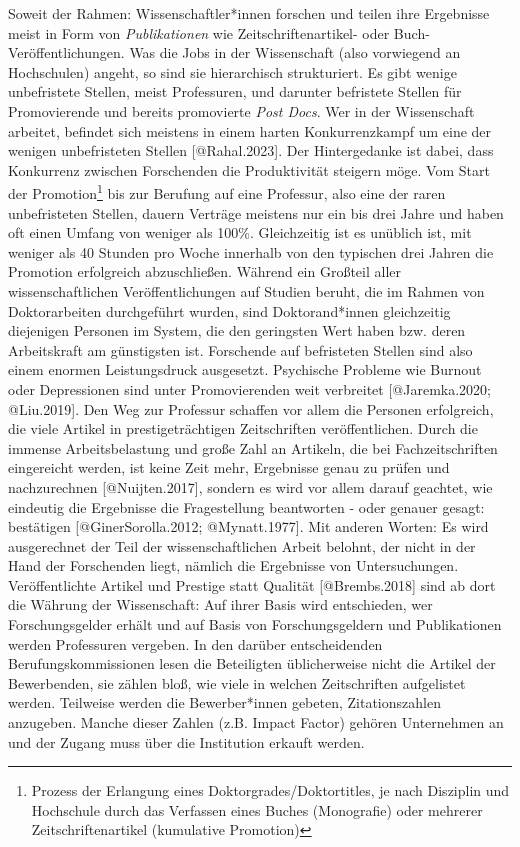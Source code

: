 \documentclass[
  letterpaper,
  DIV=11,
  numbers=noendperiod]{scrreprt}
\begin{document}
Soweit der Rahmen: Wissenschaftler*innen forschen und teilen ihre
Ergebnisse meist in Form von \emph{Publikationen} wie
Zeitschriftenartikel- oder Buch-Veröffentlichungen. Was die Jobs in der
Wissenschaft (also vorwiegend an Hochschulen) angeht, so sind sie
hierarchisch strukturiert. Es gibt wenige unbefristete Stellen, meist
Professuren, und darunter befristete Stellen für Promovierende und
bereits promovierte \emph{Post Docs}. Wer in der Wissenschaft arbeitet,
befindet sich meistens in einem harten Konkurrenzkampf um eine der
wenigen unbefristeten Stellen {[}@Rahal.2023{]}. Der Hintergedanke ist
dabei, dass Konkurrenz zwischen Forschenden die Produktivität steigern
möge. Vom Start der Promotion\footnote{Prozess der Erlangung eines
  Doktorgrades/Doktortitles, je nach Disziplin und Hochschule durch das
  Verfassen eines Buches (Monografie) oder mehrerer Zeitschriftenartikel
  (kumulative Promotion)} bis zur Berufung auf eine Professur, also eine
der raren unbefristeten Stellen, dauern Verträge meistens nur ein bis
drei Jahre und haben oft einen Umfang von weniger als 100\%.
Gleichzeitig ist es unüblich ist, mit weniger als 40 Stunden pro Woche
innerhalb von den typischen drei Jahren die Promotion erfolgreich
abzuschließen. Während ein Großteil aller wissenschaftlichen
Veröffentlichungen auf Studien beruht, die im Rahmen von Doktorarbeiten
durchgeführt wurden, sind Doktorand*innen gleichzeitig diejenigen
Personen im System, die den geringsten Wert haben bzw. deren
Arbeitskraft am günstigsten ist. Forschende auf befristeten Stellen sind
also einem enormen Leistungsdruck ausgesetzt. Psychische Probleme wie
Burnout oder Depressionen sind unter Promovierenden weit verbreitet
{[}@Jaremka.2020; @Liu.2019{]}. Den Weg zur Professur schaffen vor allem
die Personen erfolgreich, die viele Artikel in prestigeträchtigen
Zeitschriften veröffentlichen. Durch die immense Arbeitsbelastung und
große Zahl an Artikeln, die bei Fachzeitschriften eingereicht werden,
ist keine Zeit mehr, Ergebnisse genau zu prüfen und nachzurechnen
{[}@Nuijten.2017{]}, sondern es wird vor allem darauf geachtet, wie
eindeutig die Ergebnisse die Fragestellung beantworten - oder genauer
gesagt: bestätigen {[}@GinerSorolla.2012; @Mynatt.1977{]}. Mit anderen
Worten: Es wird ausgerechnet der Teil der wissenschaftlichen Arbeit
belohnt, der nicht in der Hand der Forschenden liegt, nämlich die
Ergebnisse von Untersuchungen. Veröffentlichte Artikel und Prestige
statt Qualität {[}@Brembs.2018{]} sind ab dort die Währung der
Wissenschaft: Auf ihrer Basis wird entschieden, wer Forschungsgelder
erhält und auf Basis von Forschungsgeldern und Publikationen werden
Professuren vergeben. In den darüber entscheidenden
Berufungskommissionen lesen die Beteiligten üblicherweise nicht die
Artikel der Bewerbenden, sie zählen bloß, wie viele in welchen
Zeitschriften aufgelistet werden. Teilweise werden die Bewerber*innen
gebeten, Zitationszahlen anzugeben. Manche dieser Zahlen (z.B. Impact
Factor) gehören Unternehmen an und der Zugang muss über die Institution
erkauft werden.
\end{document}
